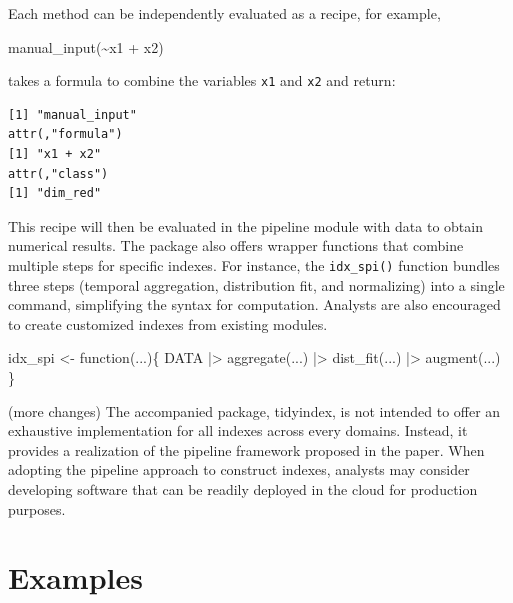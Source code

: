 \documentclass[
]{interact}
\newenvironment{Shaded}{\begin{snugshade}}{\end{snugshade}}
\newcommand{\ControlFlowTok}[1]{\textcolor[rgb]{0.00,0.23,0.31}{#1}}
\newcommand{\FunctionTok}[1]{\textcolor[rgb]{0.28,0.35,0.67}{#1}}
\newcommand{\NormalTok}[1]{\textcolor[rgb]{0.00,0.23,0.31}{#1}}
\newcommand{\OtherTok}[1]{\textcolor[rgb]{0.00,0.23,0.31}{#1}}
\newcommand{\SpecialCharTok}[1]{\textcolor[rgb]{0.37,0.37,0.37}{#1}}
\begin{document}
Each method can be independently evaluated as a recipe, for example,

\begin{Shaded}
\begin{Highlighting}[]
\FunctionTok{manual\_input}\NormalTok{(}\SpecialCharTok{\textasciitilde{}}\NormalTok{x1 }\SpecialCharTok{+}\NormalTok{ x2)}
\end{Highlighting}
\end{Shaded}

takes a formula to combine the variables \texttt{x1} and \texttt{x2} and
return:

\begin{verbatim}
[1] "manual_input"
attr(,"formula")
[1] "x1 + x2"
attr(,"class")
[1] "dim_red"
\end{verbatim}

This recipe will then be evaluated in the pipeline module with data to
obtain numerical results. The package also offers wrapper functions that
combine multiple steps for specific indexes. For instance, the
\texttt{idx\_spi()} function bundles three steps (temporal aggregation,
distribution fit, and normalizing) into a single command, simplifying
the syntax for computation. Analysts are also encouraged to create
customized indexes from existing modules.

\begin{Shaded}
\begin{Highlighting}[]
\NormalTok{idx\_spi }\OtherTok{\textless{}{-}} \ControlFlowTok{function}\NormalTok{(...)\{}
\NormalTok{  DATA }\SpecialCharTok{|\textgreater{}} 
    \FunctionTok{aggregate}\NormalTok{(...) }\SpecialCharTok{|\textgreater{}}
    \FunctionTok{dist\_fit}\NormalTok{(...) }\SpecialCharTok{|\textgreater{}} 
    \FunctionTok{augment}\NormalTok{(...)}
\NormalTok{\}}
\end{Highlighting}
\end{Shaded}

(more changes) The accompanied package, tidyindex, is not intended to
offer an exhaustive implementation for all indexes across every domains.
Instead, it provides a realization of the pipeline framework proposed in
the paper. When adopting the pipeline approach to construct indexes,
analysts may consider developing software that can be readily deployed
in the cloud for production purposes.

\hypertarget{sec-examples}{%
\section{Examples}\label{sec-examples}}
\end{document}
